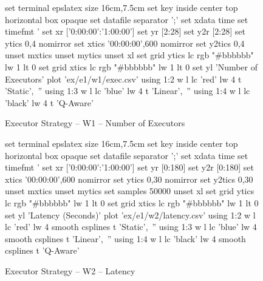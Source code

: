 \begin{figure}[H]
	\centering
	\begin{minipage}[h]{\linewidth}
    	\centering
    	\begin{gnuplot}[terminal=epslatex, terminaloptions=color colortext]
    		set terminal epslatex size 16cm,7.5cm
    		set key inside center top horizontal box opaque
    		set datafile separator ';'
    		set xdata time
    		set timefmt '%
    		set xr ['0:00:00':'1:00:00']
    		set yr [2:28]
    		set y2r [2:28]
    		set ytics 0,4 nomirror
    		set xtics '00:00:00',600 nomirror
    		set y2tics 0,4
    		unset mxtics
    		unset mytics
    		unset xl
            set grid ytics lc rgb "#bbbbbb" lw 1 lt 0
            set grid xtics lc rgb "#bbbbbb" lw 1 lt 0
    		set yl 'Number of Executors'
    		plot 'ex/e1/w1/exec.csv' using 1:2 w l lc 'red' lw 4 t 'Static',\
    		'' using 1:3 w l lc 'blue' lw 4 t 'Linear',\
    		'' using 1:4 w l lc 'black' lw 4 t 'Q-Aware'
    	\end{gnuplot}
    	\caption{Executor Strategy -- W1 -- Number of Executors}
    	\label{eval:f:e1:w1:exec}
	\end{minipage}\hfil
	\begin{minipage}[h]{\linewidth}
        \centering
        \begin{gnuplot}[terminal=epslatex, terminaloptions=color colortext]
            set terminal epslatex size 16cm,7.5cm
            set key inside center top horizontal box opaque
            set datafile separator ';'
            set xdata time
            set timefmt '%
            set xr ['0:00:00':'1:00:00']
            set yr [0:180]
            set y2r [0:180]
            set xtics '00:00:00',600 nomirror
            set ytics 0,30 nomirror
            set y2tics 0,30
            unset mxtics
            unset mytics
            set samples 50000 
            unset xl
            set grid ytics lc rgb "#bbbbbb" lw 1 lt 0
            set grid xtics lc rgb "#bbbbbb" lw 1 lt 0
            set yl 'Latency (Seconds)'
            plot 'ex/e1/w2/latency.csv' using 1:2 w l lc 'red' lw 4 smooth csplines t 'Static',\
            '' using 1:3 w l lc 'blue' lw 4 smooth csplines t 'Linear',\
            '' using 1:4 w l lc 'black' lw 4 smooth csplines t 'Q-Aware'
        \end{gnuplot}
        \caption{Executor Strategy -- W2 -- Latency}
        \label{eval:f:e1:w2:lat}
    \end{minipage}\hfil
    	\begin{minipage}[h]{\linewidth}

\end{minipage}
\end{figure}

